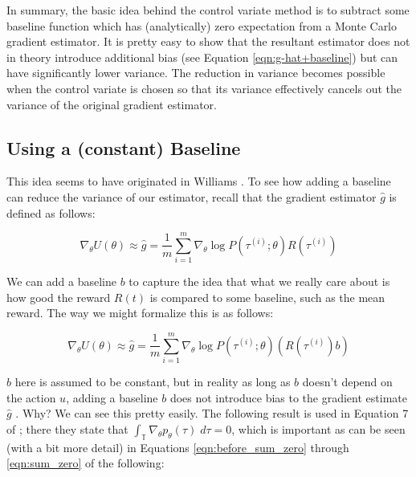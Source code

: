 \documentclass[11pt, oneside]{article}   	%
\begin{document}
\bigskip
\noindent
In summary, the basic idea behind the control variate method is to subtract some baseline function which has (analytically) zero expectation from a 
Monte Carlo gradient estimator.  It is pretty easy to show that the resultant estimator does not in theory introduce additional bias (see Equation \ref{eqn:g-hat+baseline})  
but can have significantly lower variance. The reduction in variance becomes possible when the control variate is chosen so that its variance effectively cancels out 
the variance of the original gradient estimator. 

\subsection{Using a (constant) Baseline}
\label{sec:baseline}

This idea seems to have originated in Williams \cite{Williams1992}. To see how adding a baseline can reduce the variance of our estimator, recall that the gradient estimator $\hat{g}$ is defined as follows:

\begin{equation}
\nabla_\theta U(\theta) \approx \hat{g} = \frac{1}{m} \sum\limits_{i = 1}^{m} \nabla_{\theta} \log  P(\tau^{(i)} ; \theta) R(\tau^{(i)})
\end{equation}

\bigskip
\noindent
We can add a baseline $b$ to capture the idea that what we really care about is how good the reward $R(t)$ is compared to some baseline, such as the mean reward. 
The way we might formalize this is as follows:

\begin{equation}
\nabla_\theta U(\theta) \approx \hat{g} = \frac{1}{m} \sum\limits_{i = 1}^{m} \nabla_{\theta} \log  P(\tau^{(i)} ; \theta) (R(\tau^{(i)})  b)
\end{equation}

\bigskip
\noindent
$b$ here is assumed to be constant, but in reality as long as $b$ doesn't depend on the action $u$, adding a baseline $b$ does not introduce bias to the gradient estimate 
$\hat{g}$ \cite{Williams1992}. Why? We can see this pretty easily. The following result is used in Equation 7 of  
\cite{Peters:2006fk}; there they state that $\int_{\mathbb{T}} \nabla_{\theta} p_{\theta}(\tau) \; d\tau = 0$, which is important as
can be seen (with a bit more detail) in Equations \ref{eqn:before_sum_zero} through \ref{eqn:sum_zero} of the following:
\end{document}
